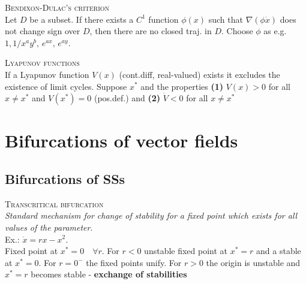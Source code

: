 \textsc{Bendixon-Dulac's criterion}\\
Let $D$ be a subset. If there exists a $C^1$ function $\phi(x)$ such that $\nabla(\phi\dot{x})$ does not change sign over $D$, then there are no closed traj. in $D$. Choose $\phi$ as e.g. $1, 1/x^ay^b,\, e^{ax},\,e^{ay}$.

\textsc{Lyapunov functions}\\
If a Lyapunov function $V(x)$ (cont.diff, real-valued) exists it excludes the existence of limit cycles. Suppose $x^*$ and the properties \textbf{(1)} $V(x)>0$ for all $x\neq x^*$ and $V(x^*)=0$ (pos.def.) and \textbf{(2)} $\dot{V}<0$ for all $x\neq x^*$ 

\section{Bifurcations of vector fields}
\subsection{Bifurcations of SSs}
\textsc{Transcritical bifurcation}\\
\emph{Standard mechanism for change of stability for a fixed point which exists for all values of the parameter}.\\
Ex.: $\dot{x}=rx-x^2$.\\
Fixed point at $x^*=0 \quad \forall r$. For $r<0$ unstable fixed point at $x^*=r$ and a stable at $x^*=0$. For $r=0^-$ the fixed points unify. For $r>0$ the origin is unstable and $x^*=r$ becomes stable - \textbf{exchange of stabilities}
\begin{center}
\end{center}
\vspace{0.2cm}



